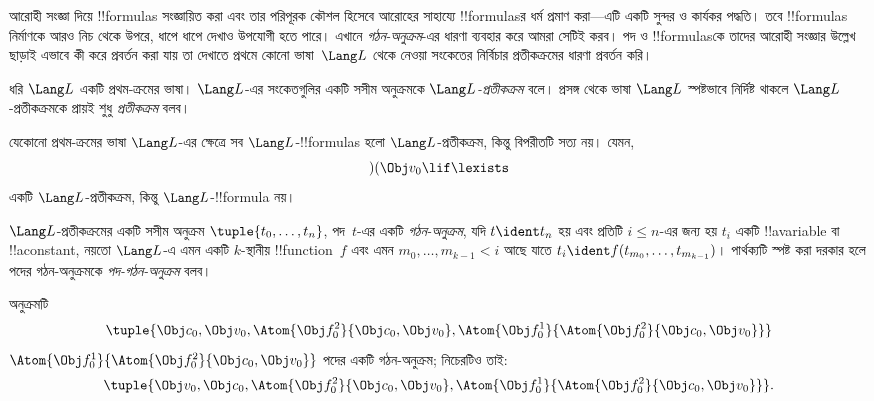 \documentclass[../../../include/open-logic-section]{subfiles}
\begin{document}


আরোহী সংজ্ঞা দিয়ে !!{formula}s সংজ্ঞায়িত করা এবং তার পরিপূরক কৌশল
হিসেবে আরোহের সাহায্যে !!{formula}sর ধর্ম প্রমাণ করা—এটি একটি সুন্দর
ও কার্যকর পদ্ধতি। তবে !!{formula}s নির্মাণকে আরও নিচ থেকে উপরে,
ধাপে ধাপে দেখাও উপযোগী হতে পারে। এখানে \emph{গঠন-অনুক্রম}-এর ধারণা
ব্যবহার করে আমরা সেটিই করব।
%
পদ ও !!{formula}sকে তাদের আরোহী সংজ্ঞার উল্লেখ ছাড়াই এভাবে কী করে
প্রবর্তন করা যায় তা দেখাতে প্রথমে কোনো ভাষা~$\Lang L$ থেকে নেওয়া
সংকেতের নির্বিচার প্রতীকক্রমের ধারণা প্রবর্তন করি।

\begin{defn}[প্রতীকক্রম]
ধরি $\Lang L$ একটি প্রথম-ক্রমের ভাষা। $\Lang L$-এর সংকেতগুলির একটি
সসীম অনুক্রমকে \emph{$\Lang L$-প্রতীকক্রম} বলে। প্রসঙ্গ থেকে ভাষা
$\Lang L$ স্পষ্টভাবে নির্দিষ্ট থাকলে $\Lang L$-প্রতীকক্রমকে প্রায়ই
শুধু \emph{প্রতীকক্রম} বলব।
\end{defn}

\begin{ex}
যেকোনো প্রথম-ক্রমের ভাষা $\Lang L$-এর ক্ষেত্রে সব $\Lang
L$-!!{formula}s হলো $\Lang L$-প্রতীকক্রম, কিন্তু বিপরীতটি সত্য নয়।
যেমন, \[)(\Obj v_0\lif\lexists\] একটি $\Lang L$-প্রতীকক্রম, কিন্তু
$\Lang L$-!!{formula} নয়।
\end{ex}

\begin{defn}[পদের গঠন-অনুক্রম]
$\Lang L$-প্রতীকক্রমের একটি সসীম অনুক্রম
$\tuple{t_0,\dotsc,t_n}$, পদ~$t$-এর একটি \emph{গঠন-অনুক্রম}, যদি
$t \ident t_n$ হয় এবং প্রতিটি $i \leq n$-এর জন্য হয় $t_i$ একটি
!!a{variable} বা !!a{constant}, নয়তো $\Lang L$-এ এমন একটি $k$-স্থানীয়
!!{function}~$f$ এবং এমন $m_0,\dotsc,m_{k-1} < i$ আছে যাতে
$t_i \ident f(t_{m_0},\dotsc,t_{m_{k-1}})$। পার্থক্যটি স্পষ্ট করা
দরকার হলে পদের গঠন-অনুক্রমকে \emph{পদ-গঠন-অনুক্রম} বলব।
\end{defn}


\begin{ex}
অনুক্রমটি
\[
    \tuple{\Obj c_0, \Obj v_0, \Atom{\Obj f^2_0}{\Obj c_0, \Obj v_0}, \Atom{\Obj f^1_0}{\Atom{\Obj f^2_0}{\Obj c_0, \Obj v_0}}}
\]
$\Atom{\Obj f^1_0}{\Atom{\Obj f^2_0}{\Obj c_0, \Obj v_0}}$ পদের একটি
গঠন-অনুক্রম; নিচেরটিও তাই:
\[
    \tuple{\Obj v_0, \Obj c_0, \Atom{\Obj f^2_0}{\Obj c_0, \Obj v_0}, \Atom{\Obj f^1_0}{\Atom{\Obj f^2_0}{\Obj c_0, \Obj v_0}}}.
\]
\end{ex}
\end{document}
